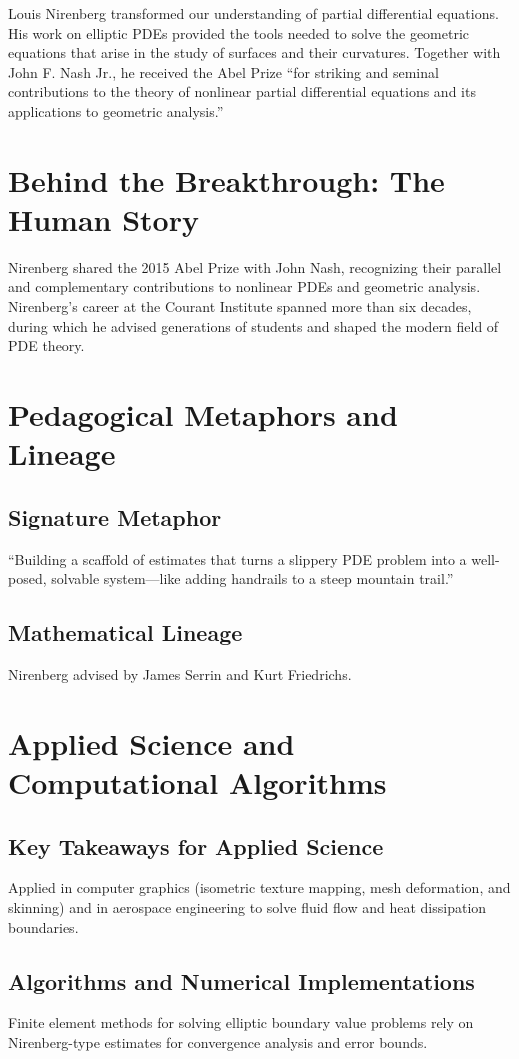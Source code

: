 Louis Nirenberg transformed our understanding of partial differential equations. His work on elliptic PDEs provided the tools needed to solve the geometric equations that arise in the study of surfaces and their curvatures. Together with John F. Nash Jr., he received the Abel Prize ``for striking and seminal contributions to the theory of nonlinear partial differential equations and its applications to geometric analysis.''

\section{Behind the Breakthrough: The Human Story}
Nirenberg shared the 2015 Abel Prize with John Nash, recognizing their parallel and complementary contributions to nonlinear PDEs and geometric analysis. Nirenberg's career at the Courant Institute spanned more than six decades, during which he advised generations of students and shaped the modern field of PDE theory.

\section{Pedagogical Metaphors and Lineage}
\subsection{Signature Metaphor}
``Building a scaffold of estimates that turns a slippery PDE problem into a well-posed, solvable system---like adding handrails to a steep mountain trail.''

\subsection{Mathematical Lineage}
Nirenberg advised by James Serrin and Kurt Friedrichs.

\section{Applied Science and Computational Algorithms}
\subsection{Key Takeaways for Applied Science}
Applied in computer graphics (isometric texture mapping, mesh deformation, and skinning) and in aerospace engineering to solve fluid flow and heat dissipation boundaries.

\subsection{Algorithms and Numerical Implementations}
Finite element methods for solving elliptic boundary value problems rely on Nirenberg-type estimates for convergence analysis and error bounds.

